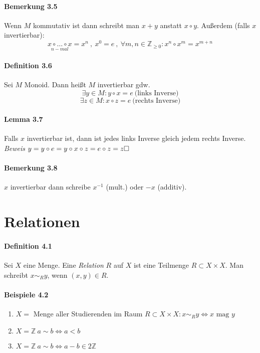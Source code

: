 \documentclass{scrartcl}
\begin{document}
\paragraph{Bemerkung 3.5} Wenn $M$ kommutativ ist dann schreibt man $x+y$
anstatt $x \circ y$. Außerdem (falls $x$ invertierbar):
\[
  \underset{n-mal}{x \circ \dots \circ x} = x^n ~,~ x^0 = e ~,~ \forall m,n \in
  \mathbb{Z}_{\geq 0}: x^n \circ x^m = x^{m+n}
\]

\paragraph{Definition 3.6} Sei $M$ Monoid. Dann heißt $M$ invertierbar gdw.
\[
  \exists y \in M: y \circ x = e ~\text{(links Inverse)}
\]
\[
  \exists z \in M: x \circ z = e ~\text{(rechts Inverse)}
\]

\paragraph{Lemma 3.7} Falls $x$ invertierbar ist, dann ist jedes links Inverse
gleich jedem rechts Inverse. \\
\textit{Beweis} $y = y \circ e = y \circ x \circ z = e \circ z = z \hfill
\square$

\paragraph{Bemerkung 3.8} $x$ invertierbar dann schreibe $x^{-1}$ (mult.) oder
$-x$ (additiv).

\section{Relationen}
\label{sec:relationen}

\paragraph{Definition 4.1} Sei $X$ eine Menge. Eine \textit{Relation} $R$ auf
$X$ ist eine Teilmenge $R \subset X \times X$. Man schreibt $x \sim_R y$, wenn
$(x,y) \in R$.

\paragraph{Beispiele 4.2}
\begin{enumerate}
\item $X =$ Menge aller Studierenden im Raum $R \subset X \times X: x \sim_R y
  \Leftrightarrow \text{$x$ mag $y$}$
\item $X = \mathbb{Z}~a \sim b \Leftrightarrow a < b$
\item $X = \mathbb{Z}~a \sim b \Leftrightarrow a - b \in 2\mathbb{Z}$
\end{enumerate}
\end{document}
